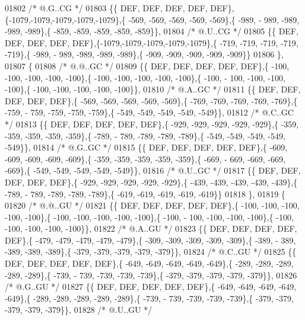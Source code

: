 \begin{DoxyCode}
01802 \textcolor{comment}{/*  @.G..CG */}
01803 \{\{  DEF,  DEF,  DEF,  DEF,  DEF\},\{-1079,-1079,-1079,-1079,-1079\},\{ -569, -569, -569, -569, -569\},\{ -989, -
      989, -989, -989, -989\},\{ -859, -859, -859, -859, -859\}\},
01804 \textcolor{comment}{/*  @.U..CG */}
01805 \{\{  DEF,  DEF,  DEF,  DEF,  DEF\},\{-1079,-1079,-1079,-1079,-1079\},\{ -719, -719, -719, -719, -719\},\{ -989, -
      989, -989, -989, -989\},\{ -909, -909, -909, -909, -909\}\}
01806 \},
01807 \{
01808 \textcolor{comment}{/*  @.@..GC */}
01809 \{\{  DEF,  DEF,  DEF,  DEF,  DEF\},\{ -100, -100, -100, -100, -100\},\{ -100, -100, -100, -100, -100\},\{ -100, -
      100, -100, -100, -100\},\{ -100, -100, -100, -100, -100\}\},
01810 \textcolor{comment}{/*  @.A..GC */}
01811 \{\{  DEF,  DEF,  DEF,  DEF,  DEF\},\{ -569, -569, -569, -569, -569\},\{ -769, -769, -769, -769, -769\},\{ -759, -
      759, -759, -759, -759\},\{ -549, -549, -549, -549, -549\}\},
01812 \textcolor{comment}{/*  @.C..GC */}
01813 \{\{  DEF,  DEF,  DEF,  DEF,  DEF\},\{ -929, -929, -929, -929, -929\},\{ -359, -359, -359, -359, -359\},\{ -789, -
      789, -789, -789, -789\},\{ -549, -549, -549, -549, -549\}\},
01814 \textcolor{comment}{/*  @.G..GC */}
01815 \{\{  DEF,  DEF,  DEF,  DEF,  DEF\},\{ -609, -609, -609, -609, -609\},\{ -359, -359, -359, -359, -359\},\{ -669, -
      669, -669, -669, -669\},\{ -549, -549, -549, -549, -549\}\},
01816 \textcolor{comment}{/*  @.U..GC */}
01817 \{\{  DEF,  DEF,  DEF,  DEF,  DEF\},\{ -929, -929, -929, -929, -929\},\{ -439, -439, -439, -439, -439\},\{ -789, -
      789, -789, -789, -789\},\{ -619, -619, -619, -619, -619\}\}
01818 \},
01819 \{
01820 \textcolor{comment}{/*  @.@..GU */}
01821 \{\{  DEF,  DEF,  DEF,  DEF,  DEF\},\{ -100, -100, -100, -100, -100\},\{ -100, -100, -100, -100, -100\},\{ -100, -
      100, -100, -100, -100\},\{ -100, -100, -100, -100, -100\}\},
01822 \textcolor{comment}{/*  @.A..GU */}
01823 \{\{  DEF,  DEF,  DEF,  DEF,  DEF\},\{ -479, -479, -479, -479, -479\},\{ -309, -309, -309, -309, -309\},\{ -389, -
      389, -389, -389, -389\},\{ -379, -379, -379, -379, -379\}\},
01824 \textcolor{comment}{/*  @.C..GU */}
01825 \{\{  DEF,  DEF,  DEF,  DEF,  DEF\},\{ -649, -649, -649, -649, -649\},\{ -289, -289, -289, -289, -289\},\{ -739, -
      739, -739, -739, -739\},\{ -379, -379, -379, -379, -379\}\},
01826 \textcolor{comment}{/*  @.G..GU */}
01827 \{\{  DEF,  DEF,  DEF,  DEF,  DEF\},\{ -649, -649, -649, -649, -649\},\{ -289, -289, -289, -289, -289\},\{ -739, -
      739, -739, -739, -739\},\{ -379, -379, -379, -379, -379\}\},
01828 \textcolor{comment}{/*  @.U..GU */}

\end{DoxyCode}
